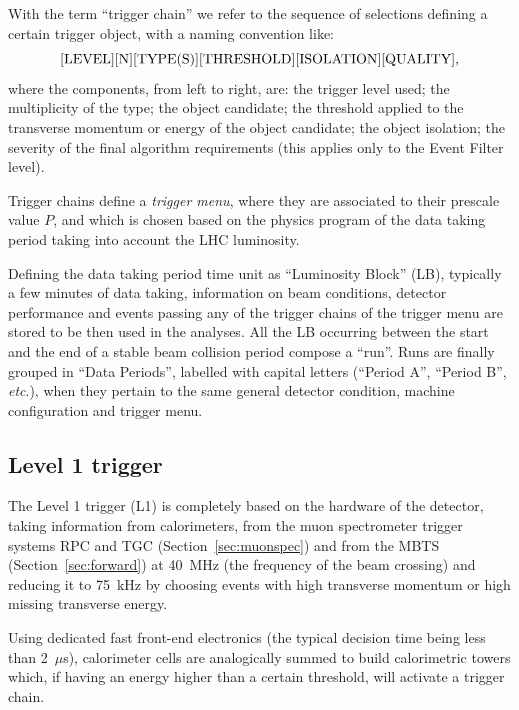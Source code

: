 With the term ``trigger chain'' we refer to the sequence of selections
defining a certain trigger object, with a naming convention like:
\begin{equation*}\label{eq:}
{\rm [LEVEL][N][TYPE(S)][THRESHOLD][ISOLATION][QUALITY]},
\end{equation*}
where the components, from left to right, are: the trigger level used; the
multiplicity of the type; the object candidate; the threshold applied to
the transverse momentum or energy of the object candidate; the object isolation;
the severity of the final algorithm requirements (this applies only to the Event
Filter level).

Trigger chains define a {\it trigger menu}, where they are associated to their
prescale value $P$, and which is chosen based on the physics program of the
data taking period taking into account the LHC luminosity. 

Defining the data taking period time unit as ``Luminosity Block'' (LB), typically
a few minutes of  data taking, information on beam conditions, detector performance 
and events passing any of the trigger chains of the trigger menu are stored
to be then used in the analyses. All the LB occurring between the start and the
end of a stable beam collision period compose a ``run''. Runs are finally grouped
in ``Data Periods'', labelled with capital letters (``Period A'', ``Period B'', {\it etc}.),
when they pertain to the same general detector condition, machine configuration and
trigger menu.




\subsection{Level 1 trigger}\label{sec:lvl1}

The Level 1 trigger (L1) is completely based on the hardware of the detector,
taking information from calorimeters, from the muon spectrometer trigger
systems RPC and TGC (Section~\ref{sec:muonspec}) and from the MBTS (Section~\ref{sec:forward}) 
at 40~MHz (the frequency of the beam crossing) and reducing it to 75~kHz by choosing events with high
transverse momentum or high missing transverse energy.

Using dedicated fast front-end electronics (the typical decision time being less than
2~$\mu$s), calorimeter cells are analogically 
summed to build calorimetric towers which, if having an energy higher than a 
certain threshold, will activate a trigger chain.

